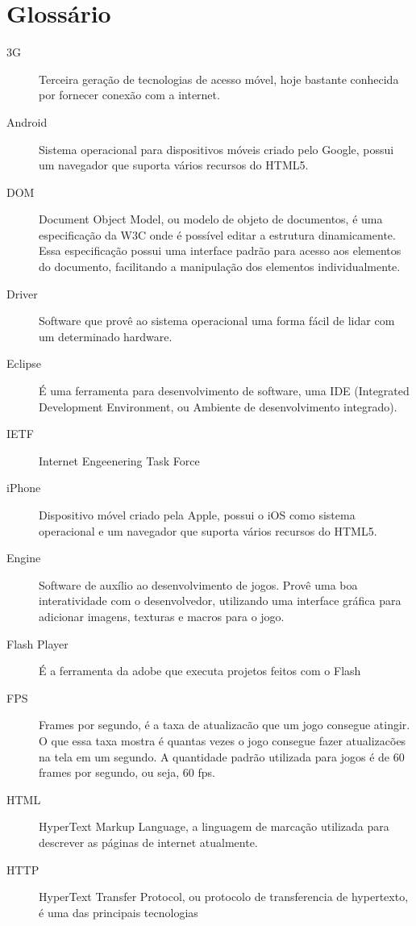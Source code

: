 
\section*{Glossário}

\begin{description}
\item[3G ] Terceira geração de tecnologias de acesso móvel, hoje
bastante conhecida por fornecer conexão com a internet.
\item[Android ] Sistema operacional para dispositivos móveis criado
pelo Google, possui um navegador que suporta vários recursos do HTML5.
\item[DOM ] Document Object Model, ou modelo de objeto de documentos,
é uma especificação da W3C onde é possível editar a estrutura
dinamicamente. Essa especificação possui uma interface padrão para
acesso aos elementos do documento, facilitando a manipulação dos
elementos individualmente.
\item[Driver ] Software que provê ao sistema operacional uma forma
fácil de lidar com um determinado hardware.
\item[Eclipse ] É uma ferramenta para desenvolvimento de software, uma
IDE (Integrated Development Environment, ou Ambiente de
desenvolvimento integrado).
\item[IETF ] Internet Engeenering Task Force
\item[iPhone ] Dispositivo móvel criado pela Apple, possui o iOS como
sistema operacional e um navegador que suporta vários recursos do HTML5.
\item[Engine ] Software de auxílio ao desenvolvimento de jogos. Provê
uma boa interatividade com o desenvolvedor, utilizando uma interface
gráfica para adicionar imagens, texturas e macros para o jogo.
\item[Flash Player ] É a ferramenta da adobe que executa projetos
feitos com o Flash
\item[FPS ] Frames por segundo, é a taxa de atualizacão que um jogo
consegue atingir. O que essa taxa mostra é quantas vezes o jogo
consegue fazer atualizacões na tela em um segundo. A quantidade padrão
utilizada para jogos é de 60 frames por segundo, ou seja, 60 fps.
\item[HTML ] HyperText Markup Language, a linguagem de marcação
utilizada para descrever as páginas de internet atualmente.
\item[HTTP ] HyperText Transfer Protocol, ou protocolo de
transferencia de hypertexto, é uma das principais tecnologias

\end{description}
